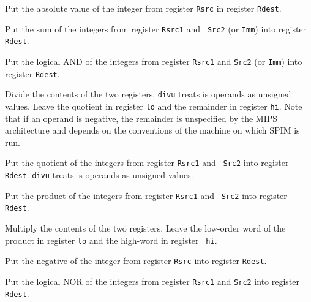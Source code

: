 \documentclass[11pt]{article}
\begin{document}
Put the absolute value of the integer from register {\tt Rsrc} in
register {\tt Rdest}.

Put the sum of the integers from register {\tt Rsrc1} and {\tt
Src2} (or {\tt Imm}) into register {\tt Rdest}.

Put the logical AND of the integers from register {\tt Rsrc1} and
{\tt Src2} (or {\tt Imm}) into register {\tt Rdest}.

Divide the contents of the two registers.
{\tt divu} treats is operands as unsigned values.  Leave the quotient in
register {\tt lo} and the remainder in register {\tt hi}.  Note that
if an operand is negative, the remainder is unspecified by the MIPS
architecture and depends on the conventions of the machine on which
SPIM is run.

Put the quotient of the integers from register {\tt Rsrc1} and {\tt
Src2} into register {\tt Rdest}. {\tt divu} treats is operands as
unsigned values.

Put the product of the integers from register {\tt Rsrc1} and {\tt
Src2} into register {\tt Rdest}.

Multiply the contents of the two registers.  Leave the low-order word
of the product in register {\tt lo} and the high-word in register {\tt
hi}.

Put the negative of the integer from register {\tt Rsrc} into
register {\tt Rdest}.

Put the logical NOR of the integers from register {\tt Rsrc1} and
{\tt Src2} into register {\tt Rdest}.
\end{document}
